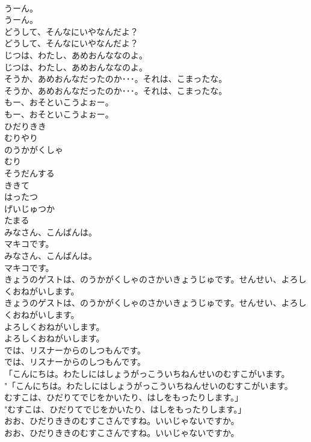 \documentclass[8pt]{extreport}
\begin{document}
\begin{CJK}{UTF8}{min}
\\	うーん。	
\\	うーん。 
\\	どうして、そんなにいやなんだよ？	
\\	どうして、そんなにいやなんだよ？ 
\\	じつは、わたし、あめおんななのよ。	
\\	じつは、わたし、あめおんななのよ。 
\\	そうか、あめおんなだったのか･･･。それは、こまったな。	
\\	そうか、あめおんなだったのか･･･。それは、こまったな。 
\\	もー、おそといこうよぉー。	
\\	もー、おそといこうよぉー。 
\\	ひだりきき
\\	むりやり
\\	のうかがくしゃ
\\	むり
\\	そうだんする
\\	ききて
\\	はったつ
\\	げいじゅつか
\\	たまる
\\	みなさん、こんばんは。
\\	マキコです。	
\\	みなさん、こんばんは。
\\	マキコです。 
\\	きょうのゲストは、のうかがくしゃのさかいきょうじゅです。せんせい、よろしくおねがいします。	
\\	きょうのゲストは、のうかがくしゃのさかいきょうじゅです。せんせい、よろしくおねがいします。 
\\	よろしくおねがいします。	
\\	よろしくおねがいします。 
\\	では、リスナーからのしつもんです。	
\\	では、リスナーからのしつもんです。 
\\	「こんにちは。わたしにはしょうがっこういちねんせいのむすこがいます。	
\\	"「こんにちは。わたしにはしょうがっこういちねんせいのむすこがいます。 
\\	むすこは、ひだりてでじをかいたり、はしをもったりします。」	
\\	"むすこは、ひだりてでじをかいたり、はしをもったりします。」 
\\	おお、ひだりききのむすこさんですね。いいじゃないですか。	
\\	おお、ひだりききのむすこさんですね。いいじゃないですか。 

\end{CJK}
\end{document}
